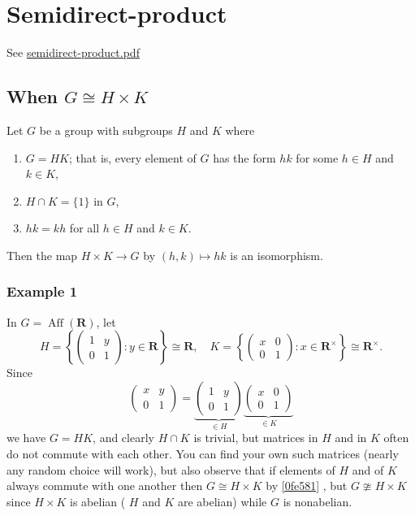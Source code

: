 \section{Semidirect-product}

See \href{https://kconrad.math.uconn.edu/blurbs/grouptheory/semidirect-product.pdf}{semidirect-product.pdf}

\subsection{When \texorpdfstring{$G\cong H\times K$}{Gcong Htimes K}}

\begin{theorem}
Let $G$ be a group with subgroups $H$ and $K$ where
	\begin{enumerate}
		\item $G=H K$; that is, every element of $G$ has the form $h k$ for some $h \in H$ and $k \in K$,
		\item $H \cap K=\{1\}$ in $G$,
		\item $h k=k h$ for all $h \in H$ and $k \in K$.
	\end{enumerate}
Then the map $H \times K \rightarrow G$ by $(h, k) \mapsto h k$ is an isomorphism.\label{0fe581}
\end{theorem}

\subsubsection{Example 1}

In $G=\operatorname{Aff}(\mathbf{R})$, let
\[
H=\left\{\left(\begin{array}{ll}
1 & y \\
0 & 1
\end{array}\right): y \in \mathbf{R}\right\} \cong \mathbf{R}, \quad K=\left\{\left(\begin{array}{ll}
x & 0 \\
0 & 1
\end{array}\right): x \in \mathbf{R}^{\times}\right\} \cong \mathbf{R}^{\times} .
\]
Since
\[
\left(\begin{array}{ll}
x & y \\
0 & 1
\end{array}\right)=\underbrace{\left(\begin{array}{ll}
1 & y \\
0 & 1
\end{array}\right)}_{\in H} \underbrace{\left(\begin{array}{ll}
x & 0 \\
0 & 1
\end{array}\right)}_{\in K}
\]
we have $G=H K$, and clearly $H \cap K$ is trivial, but matrices in $H$ and in $K$ often do not commute with each other. You can find your own such matrices (nearly any random choice will work), but also observe that if elements of $H$ and of $K$ always commute with one another then $G \cong H \times K$ by \cref{0fe581} , but $G \ncong H \times K$ since $H \times K$ is abelian ( $H$ and $K$ are abelian) while $G$ is nonabelian.

